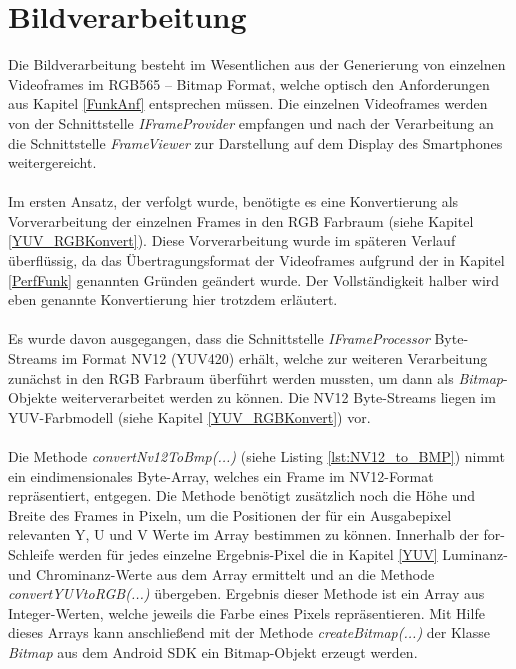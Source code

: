 \chapter{Bildverarbeitung} \label{chap:Bildverarbeitung}

Die Bildverarbeitung besteht im Wesentlichen aus der Generierung von einzelnen Videoframes im RGB565 – Bitmap Format, welche optisch den Anforderungen aus Kapitel \ref{FunkAnf} entsprechen müssen. Die einzelnen Videoframes werden von der Schnittstelle \textit{IFrameProvider} empfangen und nach der Verarbeitung an die Schnittstelle \textit{FrameViewer} zur Darstellung auf dem Display des Smartphones weitergereicht.
\\
\\
Im ersten Ansatz, der verfolgt wurde, benötigte es eine Konvertierung als Vorverarbeitung der einzelnen Frames in den RGB Farbraum (siehe Kapitel \ref{YUV_RGBKonvert}). Diese Vorverarbeitung wurde im späteren Verlauf überflüssig, da das Übertragungsformat der Videoframes aufgrund der in Kapitel \ref{PerfFunk} genannten Gründen geändert wurde. Der Vollständigkeit halber wird eben genannte Konvertierung hier trotzdem erläutert.
\\
\\
Es wurde davon ausgegangen, dass die Schnittstelle \textit{IFrameProcessor} Byte-Streams im Format NV12 (YUV420) erhält, welche zur weiteren Verarbeitung zunächst in den RGB Farbraum überführt werden mussten, um dann als \textit{Bitmap}-Objekte weiterverarbeitet werden zu können. Die NV12 Byte-Streams liegen im YUV-Farbmodell (siehe Kapitel \ref{YUV_RGBKonvert}) vor. 
\\
\\
Die Methode \textit{convertNv12ToBmp(...)} (siehe Listing \ref{lst:NV12_to_BMP}) nimmt ein eindimensionales Byte-Array, welches ein Frame im NV12-Format repräsentiert, entgegen. Die Methode benötigt zusätzlich noch die Höhe und Breite des Frames in Pixeln, um die Positionen der für ein Ausgabepixel relevanten Y, U und V Werte im Array bestimmen zu können. Innerhalb der for-Schleife werden für jedes einzelne Ergebnis-Pixel die in Kapitel \ref{YUV} Luminanz- und Chrominanz-Werte aus dem Array ermittelt und an die Methode \textit{convertYUVtoRGB(...)} übergeben. Ergebnis dieser Methode ist ein Array aus Integer-Werten, welche jeweils die Farbe eines Pixels repräsentieren. Mit Hilfe dieses Arrays kann anschließend mit der Methode \textit{createBitmap(...)} der Klasse \textit{Bitmap} aus dem Android SDK ein Bitmap-Objekt erzeugt werden. 
\clearpage

